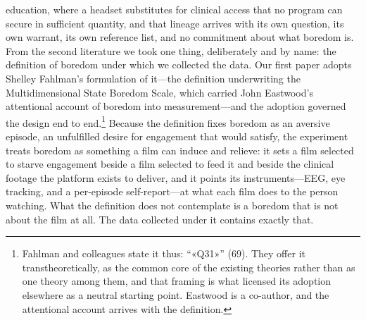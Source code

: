 education, where a headset substitutes for clinical access that no program can secure in
sufficient quantity, and that lineage arrives with its own question, its own warrant, its own
reference list, and no commitment about what boredom is. From the second literature we took
one thing, deliberately and by name: the definition of boredom under which we collected the
data. Our first paper adopts Shelley Fahlman's formulation of it---the definition
underwriting the Multidimensional State Boredom Scale, which carried John Eastwood's
attentional account of boredom into measurement---and the adoption governed the design end to
end.\footnote{Fahlman and colleagues state it thus: ``«Q31»'' (69). They offer it
transtheoretically, as the common core of the existing theories rather than as one theory
among them, and that framing is what licensed its adoption elsewhere as a neutral starting
point. Eastwood is a co-author, and the attentional account arrives with the definition.} Because the definition fixes boredom as an aversive episode, an unfulfilled desire for
engagement that would satisfy, the experiment treats boredom as something a film can induce
and relieve: it sets a film selected to starve engagement beside a film selected to feed it
and beside the clinical footage the platform exists to deliver, and it points its
instruments---EEG, eye tracking, and a per-episode self-report---at what each film does to
the person watching. What the definition does not contemplate is a boredom that is not about
the film at all. The data collected under it contains exactly that.

\begin{center}
\end{center}

